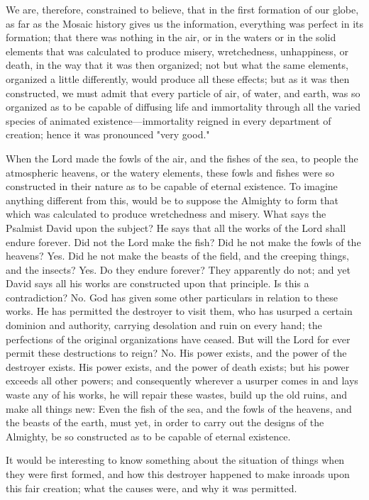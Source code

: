 We are, therefore, constrained to believe, that in the first formation of our globe, as far as the
Mosaic history gives us the information, everything was perfect in its formation; that there
was nothing in the air, or in the waters or in the solid elements that was calculated to produce
misery, wretchedness, unhappiness, or death, in the way that it was then organized; not but
what the same elements, organized a little differently, would produce all these effects; but as
it was then constructed, we must admit that every particle of air, of water, and earth, was so
organized as to be capable of diffusing life and immortality through all the varied species of
animated existence—immortality reigned in every department of creation; hence it was
pronounced "very good."

When the Lord made the fowls of the air, and the fishes of the sea, to people the atmospheric
heavens, or the watery elements, these fowls and fishes were so constructed in their nature as
to be capable of eternal existence. To imagine anything different from this, would be to
suppose the Almighty to form that which was calculated to produce wretchedness and
misery. What says the Psalmist David upon the subject? He says that all the works of the
Lord shall endure forever. Did not the Lord make the fish? Did he not make the fowls of the
heavens? Yes. Did he not make the beasts of the field, and the creeping things, and the
insects? Yes. Do they endure forever? They apparently do not; and yet David says all his
works are constructed upon that principle. Is this a contradiction? No. God has given some
other particulars in relation to these works. He has permitted the destroyer to visit them, who
has usurped a certain dominion and authority, carrying desolation and ruin on every hand; the
perfections of the original organizations have ceased. But will the Lord for ever permit these
destructions to reign? No. His power exists, and the power of the destroyer exists. His power
exists, and the power of death exists; but his power exceeds all other powers; and
consequently wherever a usurper comes in and lays waste any of his works, he will repair
these wastes, build up the old ruins, and make all things new: Even the fish of the sea, and
the fowls of the heavens, and the beasts of the earth, must yet, in order to carry out the
designs of the Almighty, be so constructed as to be capable of eternal existence.

It would be interesting to know something about the situation of things when they were first
formed, and how this destroyer happened to make inroads upon this fair creation; what the
causes were, and why it was permitted.

